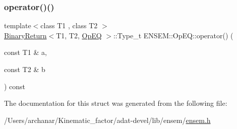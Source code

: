 \subsubsection{\texorpdfstring{operator()()}{operator()()}\hspace{0.1cm}{\footnotesize\ttfamily [3/3]}}
{\footnotesize\ttfamily template$<$class T1 , class T2 $>$ \\
\mbox{\hyperlink{structENSEM_1_1BinaryReturn}{Binary\+Return}}$<$T1, T2, \mbox{\hyperlink{structENSEM_1_1OpEQ}{Op\+EQ}} $>$\+::Type\+\_\+t E\+N\+S\+E\+M\+::\+Op\+E\+Q\+::operator() (\begin{DoxyParamCaption}\item[{const T1 \&}]{a,  }\item[{const T2 \&}]{b }\end{DoxyParamCaption}) const\hspace{0.3cm}{\ttfamily [inline]}}



The documentation for this struct was generated from the following file\+:\begin{DoxyCompactItemize}
\item 
/\+Users/archanar/\+Kinematic\+\_\+factor/adat-\/devel/lib/ensem/\mbox{\hyperlink{adat-devel_2lib_2ensem_2ensem_8h}{ensem.\+h}}\end{DoxyCompactItemize}
